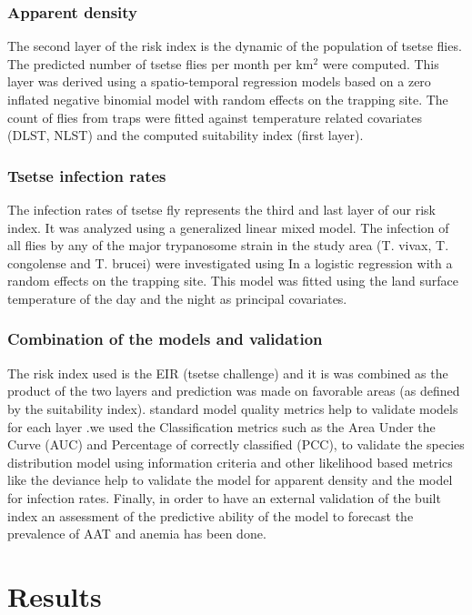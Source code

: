 \documentclass[10pt]{article}
\begin{document}
\subsubsection*{Apparent density}
\label{unnumbered-10}
The second layer of the risk index is the dynamic of the population of tsetse flies. 
The predicted number of tsetse flies per month per km\(^{\text{2}}\) were computed. 
This layer was derived using a spatio-temporal regression models based on a zero inflated negative binomial model with random effects on the trapping site. The count of flies from traps were fitted against temperature related covariates (DLST, NLST) and the computed suitability index (first layer). 

\subsubsection*{Tsetse infection rates}
\label{unnumbered-11}
The infection rates of tsetse fly represents the third and last layer of our risk index. 
It was  analyzed using a generalized linear mixed model. 
The infection of all flies by any of the major trypanosome strain in the study area (T. vivax, T. congolense and T. brucei) were investigated using In a logistic regression with a random effects on the trapping site.  This model was fitted using  the land surface temperature of the day and the night as principal covariates. 


\subsubsection*{Combination of the models and validation}
\label{unnumbered-12}
The risk index used is the EIR (tsetse challenge) and it is was combined as the product of the two layers and prediction was made on favorable areas (as defined by the suitability index). 
standard model quality metrics help to validate models for each layer .we used the  Classification metrics such as the Area Under the Curve (AUC) and Percentage of correctly classified (PCC),
to validate the species distribution model using information criteria and other likelihood based metrics like the deviance help to validate the model for apparent density and the model for infection rates.
Finally, in order to have an external validation of the built index an assessment of the predictive ability of the model to forecast the prevalence of AAT and anemia has been done. 

\section*{Results}
\label{unnumbered-13}
\end{document}
